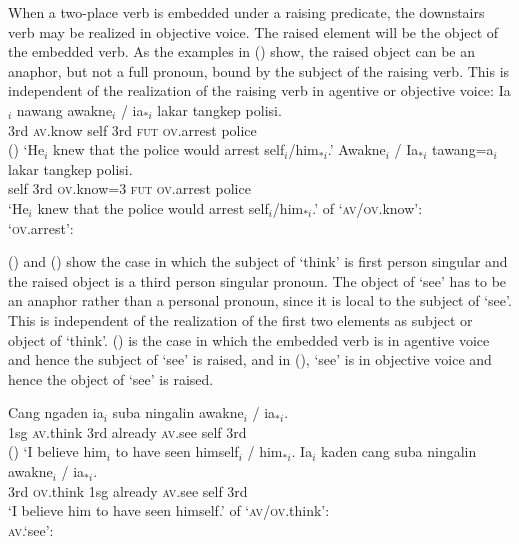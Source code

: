 \documentclass[output=paper,biblatex,babelshorthands,newtxmath,draftmode,colorlinks,citecolor=brown]{langscibook}
\begin{document}
When a two-place verb is embedded under a raising predicate, the downstairs verb may be realized in
objective voice. The raised element will be the object of the embedded verb. As the examples in
() show, the raised object can be an anaphor, but not a full pronoun, bound by the subject of
the raising verb. This is independent of the realization of the raising verb in agentive or objective voice: 
\eal
\ex 
\gll Ia$_i$ nawang           awakne$_i$ / ia$_{*i}$ lakar        tangkep            polisi.\\
    3rd    \textsc{av}.know self      {} 3rd      \textsc{fut} \textsc{ov}.arrest police\\\hfill()
\glt `He$_i$ knew that the police would arrest self$_{i}$/him$_{*i}$.'
\ex 
\gll Awakne$_i$ / Ia$_{*i}$        tawang=a$_i$           lakar       tangkep            polisi.\\
    self       {} \hphantom{*}3rd \textsc{ov}.know=3 \textsc{fut} \textsc{ov}.arrest police\\
\glt `He$_i$ knew that the police would arrest self$_{i}$/him$_{*i}$.'
\ex \argst of `\textsc{av}/\textsc{ov}.know':\\
\ex `\textsc{ov}.arrest':\\
\zl


() and () show the case in which the \argst subject of `think' is first person singular and the
raised \argst object is a third person singular pronoun. The object of `see' has to be an anaphor rather than a personal pronoun,
since it is local to the subject of `see'. This is independent of the realization of the first two
\argst elements as subject or object of `think'. () is the case in which the embedded verb is
in agentive voice and hence the subject of `see' is raised, and in (), `see' is in objective voice and
hence the object of `see' is raised.

\eal
\ex
\gll Cang ngaden            ia$_i$ suba    ningalin        awakne$_i$ /  ia$_{*i}$.\\
     1sg  \textsc{av}.think 3rd    already \textsc{av}.see self       {} 3rd\\\hfill()
\glt `I believe him$_i$ to have seen himself$_i$ / him$_{*i}$.
\ex
\gll Ia$_i$ kaden             cang suba    ningalin        awakne$_i$ / ia$_{*i}$.\\ 
     3rd \textsc{ov}.think 1sg  already \textsc{av}.see self       {} 3rd\\
\glt `I believe him to have seen himself.'
\ex \argst of `\textsc{av}/\textsc{ov}.think':\\
\ex \textsc{av}.`see':\\
\zl
\end{document}
